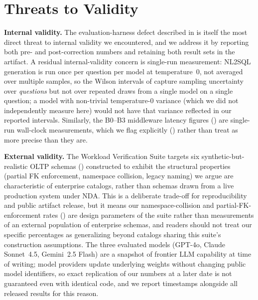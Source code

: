 \documentclass[twocolumn]{svjour3}
\begin{document}
\section{Threats to Validity}
\label{sec:threats}

\textbf{Internal validity.}
The evaluation-harness defect described in  is itself the most direct threat to internal validity we encountered, and we address it by reporting both pre- and post-correction numbers and retaining both result sets in the artifact.
A residual internal-validity concern is single-run measurement: NL2SQL generation is run once per question per model at temperature~0, not averaged over multiple samples, so the Wilson intervals of  capture sampling uncertainty over \emph{questions} but not over repeated draws from a single model on a single question; a model with non-trivial temperature-0 variance (which we did not independently measure here) would not have that variance reflected in our reported intervals.
Similarly, the B0--B3 middleware latency figures () are single-run wall-clock measurements, which we flag explicitly () rather than treat as more precise than they are.

\textbf{External validity.}
The Workload Verification Suite targets six synthetic-but-realistic OLTP schemas () constructed to exhibit the structural properties (partial FK enforcement, namespace collision, legacy naming) we argue are characteristic of enterprise catalogs, rather than schemas drawn from a live production system under NDA.
This is a deliberate trade-off for reproducibility and public artifact release, but it means our namespace-collision and partial-FK-enforcement rates () are design parameters of the suite rather than measurements of an external population of enterprise schemas, and readers should not treat our specific percentages as generalizing beyond catalogs sharing this suite's construction assumptions.
The three evaluated models (GPT-4o, Claude Sonnet~4.5, Gemini~2.5 Flash) are a snapshot of frontier LLM capability at time of writing; model providers update underlying weights without changing public model identifiers, so exact replication of our numbers at a later date is not guaranteed even with identical code, and we report timestamps alongside all released results for this reason.
\end{document}

